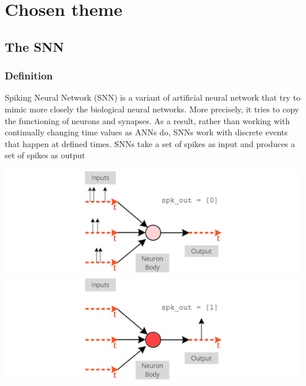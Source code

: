\documentclass{article}
\begin{document}
\section{Chosen theme}
\subsection{The SNN}
\subsubsection{Definition}
Spiking Neural Network (SNN) is a variant of artificial neural network that try to mimic more closely the biological neural networks. More precisely, it tries to copy the functioning of neurons and synapses. As a result, rather than working with continually changing time values as ANNs do, SNNs work with discrete events that happen at defined times. SNNs take a set of spikes as input and produces a set of spikes as output

\begin{center}
  \includegraphics[scale=0.3]{image/def1.png}
  \includegraphics[scale=0.3]{image/def2.png}
\end{center}
\end{document}
